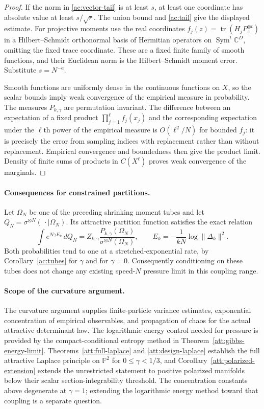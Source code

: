 \begin{proof}
If the norm in \eqref{ac:vector-tail} is at least $s$, at least one
coordinate has absolute value at least $s/\sqrt r$.  The union bound
and \eqref{ac:tail} give the displayed estimate.
For projective moments use the real coordinates
$f_j(z)=\operatorname{tr}(H_jP_z^{\otimes t})$ in a Hilbert--Schmidt
orthonormal basis of Hermitian operators on
$\operatorname{Sym}^t\mathbb C^D$, omitting the fixed trace coordinate.
These are a fixed finite family of smooth functions, and their
Euclidean norm is the Hilbert--Schmidt moment error.  Substitute
$s=N^{-a}$.

Smooth functions are uniformly dense in the continuous functions on
$X$, so the scalar bounds imply weak convergence of the empirical
measure in probability.  The measures $P_{k,\gamma}$ are permutation
invariant.  The difference between an expectation of a fixed product
$\prod_{j=1}^{\ell}f_j(x_j)$ and the corresponding expectation under
the $\ell$th power of the empirical measure is $O(\ell^2/N)$ for
bounded $f_j$: it is precisely the error from sampling indices with
replacement rather than without replacement.  Empirical convergence
and boundedness then give the product limit.  Density of finite sums
of products in $C(X^\ell)$ proves weak convergence of the marginals.
\end{proof}

\paragraph{Consequences for constrained partitions.}
Let $\Omega_N$ be one of the preceding shrinking moment tubes and
let $Q_N=\sigma^{\otimes N}(\,\cdot\mid\Omega_N)$.
Its attractive partition function satisfies the exact relation
\[
 \int e^{N\gamma E_k}\,dQ_N
 =Z_{k,\gamma}
    \frac{P_{k,\gamma}(\Omega_N)}
         {\sigma^{\otimes N}(\Omega_N)},
 \qquad
 E_k=-\frac1{kN}\log\|\Delta_k\|^2.
\]
Both probabilities tend to one at a stretched-exponential rate, by
Corollary~\ref{ac:tubes} for $\gamma$ and for $\gamma=0$.
Consequently conditioning on these tubes does not change any existing
speed-$N$ pressure limit in this coupling range.

\paragraph{Scope of the curvature argument.}
The curvature argument supplies finite-particle variance estimates,
exponential concentration of empirical observables, and propagation
of chaos for the actual attractive determinant law.  The logarithmic
energy control needed for pressure is provided by the compact-conditional
entropy method in Theorem~\ref{att:gibbs-energy-limit}.
Theorems~\ref{att:full-laplace} and \ref{att:design-laplace} establish
the full attractive Laplace principle on $\mathbb P^2$ for
$0\le\gamma<1/3$, and Corollary~\ref{att:polarized-extension}
extends the unrestricted statement to positive polarized manifolds
below their scalar section-integrability threshold.  The concentration
constants above degenerate at $\gamma=1$; extending the logarithmic
energy method toward that coupling is a separate question.
